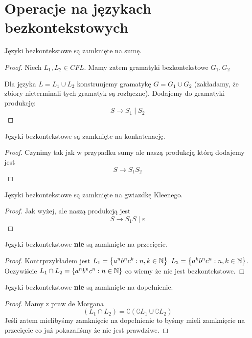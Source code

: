 \section{Operacje na językach bezkontekstowych}

\begin{theorem}
	Języki bezkontekstowe są zamknięte na sumę.
\end{theorem}
\begin{proof}
	Niech \( L_1, L_2 \in CFL \). Mamy zatem gramatyki bezkontekstowe \( G_1, G_2 \)

	Dla języka \( L = L_1 \cup L_2 \) konstruujemy gramatykę \( G = G_1 \cup G_2 \) (zakładamy, że zbiory nieterminali tych gramatyk są rozłączne).
	Dodajemy do gramatyki produkcję:
	\[
		S \rightarrow S_1 \mid S_2
	\]
\end{proof}

\begin{theorem}
	Języki bezkontekstowe są zamknięte na konkatenację.
\end{theorem}
\begin{proof}
	Czynimy tak jak w przypadku sumy ale naszą produkcją którą dodajemy jest
	\[
		S \rightarrow S_1S_2
	\]
\end{proof}

\begin{theorem}
	Języki bezkontekstowe są zamknięte na gwiazdkę Kleenego.
\end{theorem}
\begin{proof}
	Jak wyżej, ale naszą produkcją jest
	\[
		S \rightarrow S_1S \mid \varepsilon
	\]
\end{proof}


\begin{theorem}
	Języki bezkontekstowe \textbf{nie} są zamknięte na przecięcie.
\end{theorem}
\begin{proof}
	Kontrprzykładem jest \( L_1 = \set{a^nb^nc^k : n, k \in \natural} \) \( L_2 = \set{a^kb^nc^n : n, k \in \natural} \).
	Oczywiście \( L_1 \cap L_2 = \set{a^nb^nc^n : n \in \natural} \) co wiemy że nie jest bezkontekstowe.
\end{proof}


\begin{theorem}
	Języki bezkontekstowe \textbf{nie} są zamknięte na dopełnienie.
\end{theorem}
\begin{proof}
	Mamy z praw de Morgana
	\[
		(L_1 \cap L_2) = \complement{(\complement{L_1} \cup \complement{L_2})}
	\]
	Jeśli zatem mielibyśmy zamknięcie na dopełnienie to byśmy mieli zamknięcie na przecięcie co już pokazaliśmy że nie jest prawdziwe.
\end{proof}